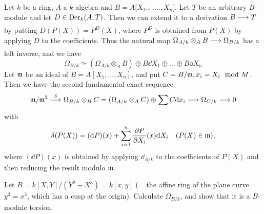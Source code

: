 \documentclass[../main]{subfiles}
\begin{document}
\begin{parexample}
    Let $k$ be a ring, $A$ a $k$-algebra and \newline $B=A[X_1.$, $.\dots, X_n]$. Let $T$ be an arbitrary $B$-module and let $D \in \operatorname{Der}_k(A, T)$. Then we can extend it to a derivation $B \varrightarrow{} T$ by putting $D(P(X))=P^D(X)$, where $P^D$ is obtained from $P(X)$ by applying $D$ to the coefficients. Thus the natural map \newline $\Omega_{A / k} \otimes_A B \varrightarrow{} \Omega_{B / k}$ has a left inverse, and we have \[\Omega_{B / k} \simeq(\Omega_{A / k} \otimes_A B) \oplus B\dd X_1 \oplus \dots \oplus B \dd X_n\] Let $\mathfrak{m}$ be an ideal of $B=A[X_1, \dots, X_n]$, and put $C=B / \mathfrak{m}, x_i=X_i \mod M$. Then we have the second fundamental exact sequence \[ \ideal{m}/ \ideal{m}^2 \varrightarrow{\delta} \Omega_{B / k} \otimes_B C=(\Omega_{A/k} \otimes_A C) \oplus \sum C\dd x_i \varrightarrow{} \Omega_{C / k} \varrightarrow{} 0\] with \[\delta(P(X))=(\dd P)(x)+\sum_{i=1}^n \pdv{P}{X_i}(x) \dd X_i \for{P(X) \in \ideal{m}},\] where $(\dd P)(x)$ is obtained by applying $\dd_{A / k}$ to the coefficients of $P(X)$ and then reducing the result modulo $\mathfrak{m}$.
\end{parexample}

\begin{exercise}\label{exe:26.04}
    Let $B=k[X, Y] /(Y^2-X^3)=k[x, y]$ (= the affine ring of the plane curve $y^2=x^3$, which has a cusp at the origin). Calculate $\Omega_{B/k}$, and show that it is a $B$-module torsion.
\end{exercise}
\end{document}
